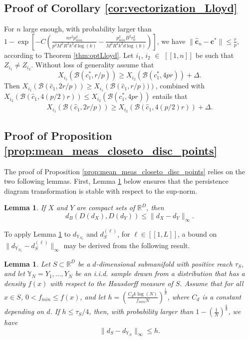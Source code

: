 \documentclass[noinfoline,preprint]{article}
\newtheorem{lem}[theorem]{Lemma}
\newcommand{\cb}{\mathbf{c}}
\newcommand{\R}{\mathbb{R}}
\renewcommand{\1}{\mathds 1}
\newcommand{\B}{\mathcal{B}}
\begin{document}
\subsection{Proof of Corollary \ref{cor:vectorization_Lloyd}}
\label{sec:proof_cor_vectorization_Lloyd}
For $n$ large enough, with probability larger than $1-\exp{\left [-C\left ( \frac{n r^2 p_{min}^2}{p^2M^2R^2k^2 d \log(k)} - \frac{p_{min}^2 B^2 r_0^2}{M^2 R^4 k^2 d \log(k)} \right ) \right ]}$, we have $\| \hat{\cb}_n - \cb^* \| \leq \frac{r}{p}$, according to Theorem \ref{thm:optLloyd}. Let $i_1$, $i_2$ $\in$ $[\![1,n]\!]$ be such that $Z_{i_1} \neq Z_{i_2}$. Without loss of generality assume that 
\[
X_{i_1} \left ( \B(c_1^*,r/p) \right ) \geq  X_{i_2} \left ( \B(c_1^*,4pr) \right ) + \Delta.
\]
Then $X_{i_1} \left ( \B(\hat{c}_1,2r/p) \right ) \geq X_{i_1} \left ( \B(\hat{c}_1,r/p)) \right )$, combined with $X_{i_2} \left ( \B(\hat{c}_1,4(p/2)r) \right ) \leq X_{i_2} \left( \B(c_1^*,4pr) \right )$ entails that
\begin{align*}
X_{i_1} \left ( \B(\hat{c}_1,2r/p) \right ) \geq X_{i_2} \left ( \B(\hat{c}_1,4(p/2)r) \right ) + \Delta.
\end{align*} 
\subsection{Proof of Proposition \ref{prop:mean_meas_closeto_disc_points}}\label{sec:proof_prop_meas_closeto_disc_points}

The proof of Proposition \ref{prop:mean_meas_closeto_disc_points} relies on the two following lemmas. First, Lemma \ref{lem:pers_diag_stability} below ensures that the persistence diagram transformation is stable with respect to the sup-norm. 
\begin{lem}{\cite{CohenSteiner07}}\label{lem:pers_diag_stability}
If $X$ and $Y$ are compact sets of $\R^D$, then 
\[
d_B \left ( D(d_X),D(d_Y) \right ) \leq \| d_X - d_Y \|_{\infty}.
\]
\end{lem}
To apply Lemma \ref{lem:pers_diag_stability} to $d_{\mathbb{Y}_{N_\ell}}$ and $d_{S}^{(\ell)}$, for $\ell \in [\![1,L]\!]$, a bound on $\|d_{\mathbb{Y}_{N_\ell}}-d_{S}^{(\ell)}\|_\infty$ may be derived from the following result.  
\begin{lem}{\cite[Lemma B.7]{Aamari19}}\label{lem:abstandard}
Let $S \subset \R^D$ be a $d$-dimensional submanifold with positive reach $\tau_S$, and let $\mathbb{Y}_N=Y_1, \hdots, Y_N$ be an i.i.d. sample drawn from a distribution that has a density $f(x)$ with respect to the Hausdorff measure of $S$. Assume that for all $x \in S$, $0 < f_{min} \leq f(x)$, and let $h= \left ( \frac{C_d k \log(N)}{f_{min}N} \right )^\frac{1}{d}$, where $C_d$ is a constant depending on $d$. If $h \leq \tau_S/4$, then, with probability larger than $1- \left ( \frac{1}{N} \right )^{\frac{k}{d}}$, we have
\[
\| d_S - d_{\mathbb{Y}_N} \|_\infty \leq h.
\]
\end{lem}
\end{document}
